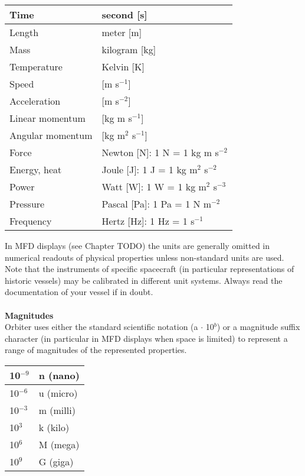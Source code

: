 \documentclass[Orbiter User Manual.tex]{subfiles}
\begin{document}
	\begin{longtable}{ |p{}|p{}| }
	\hline\rule{0pt}{2ex}
	Time & second [s]\\
	\hline\rule{0pt}{2ex}
	Length & meter [m]\\
	\hline\rule{0pt}{2ex}
	Mass & kilogram [kg]\\
	\hline\rule{0pt}{2ex}
	Temperature & Kelvin [K]\\
	\hline\rule{0pt}{2ex}
	Speed & [m s$^{-1}$]\\
	\hline\rule{0pt}{2ex}
	Acceleration & [m s$^{-2}$]\\
	\hline\rule{0pt}{2ex}
	Linear momentum & [kg m s$^{-1}$]\\
	\hline\rule{0pt}{2ex}
	Angular momentum & [kg m$^{2}$ s$^{-1}$]\\
	\hline\rule{0pt}{2ex}
	Force & Newton [N]: 1 N = 1 kg m s$^{-2}$\\
	\hline\rule{0pt}{2ex}
	Energy, heat & Joule [J]: 1 J = 1 kg m$^{2}$ s$^{-2}$\\
	\hline\rule{0pt}{2ex}
	Power & Watt [W]: 1 W = 1 kg m$^{2}$ s$^{-3}$\\
	\hline\rule{0pt}{2ex}
	Pressure & Pascal [Pa]: 1 Pa = 1 N m$^{-2}$\\
	\hline\rule{0pt}{2ex}
	Frequency & Hertz [Hz]: 1 Hz = 1 s$^{-1}$\\
	\hline
	\end{longtable}

\noindent
In MFD displays (see Chapter TODO) the units are generally omitted in numerical readouts of physical properties unless non-standard units are used.\\
Note that the instruments of specific spacecraft (in particular representations of historic vessels) may be calibrated in different unit systems. Always read the documentation of your vessel if in doubt.\\
\\
\textbf{Magnitudes}\\
Orbiter uses either the standard scientific notation (a $\cdot$ 10$^{b}$) or a magnitude suffix character (in particular in MFD displays when space is limited) to represent a range of magnitudes of the represented properties.

	\begin{longtable}{ |p{}|p{}| }
	\hline\rule{0pt}{2ex}
	10$^{-9}$ & n (nano)\\
	\hline\rule{0pt}{2ex}
	10$^{-6}$ & u (micro)\\
	\hline\rule{0pt}{2ex}
	10$^{-3}$ & m (milli)\\
	\hline\rule{0pt}{2ex}
	10$^{3}$ & k (kilo)\\
	\hline\rule{0pt}{2ex}
	10$^{6}$ & M (mega)\\
	\hline\rule{0pt}{2ex}
	10$^{9}$ & G (giga)\\
	\hline
	\end{longtable}
\end{document}
